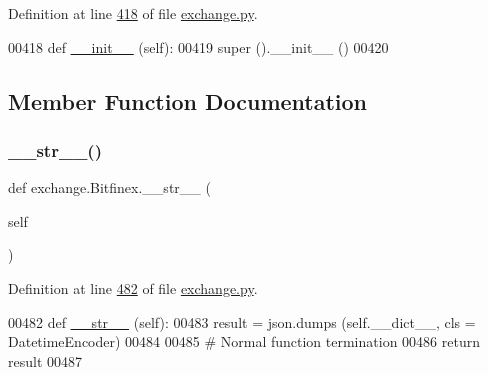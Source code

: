 Definition at line \hyperlink{exchange_8py_source_l00418}{418} of file \hyperlink{exchange_8py_source}{exchange.\+py}.


\begin{DoxyCode}
00418     \textcolor{keyword}{def }\hyperlink{namespacestart__time_a9c9bd378729a13c96a22c8b079ea172c}{\_\_init\_\_} (self):
00419         super ().\_\_init\_\_ ()
00420  
\end{DoxyCode}


\subsection{Member Function Documentation}
\mbox{\label{classexchange_1_1_bitfinex_aef5d2ae00f1574b1258ea73c851a70a8}} 
\subsubsection{\texorpdfstring{\+\_\+\+\_\+str\+\_\+\+\_\+()}{\_\_str\_\_()}}
{\footnotesize\ttfamily def exchange.\+Bitfinex.\+\_\+\+\_\+str\+\_\+\+\_\+ (\begin{DoxyParamCaption}\item[{}]{self }\end{DoxyParamCaption})}



Definition at line \hyperlink{exchange_8py_source_l00482}{482} of file \hyperlink{exchange_8py_source}{exchange.\+py}.


\begin{DoxyCode}
00482     \textcolor{keyword}{def }\hyperlink{namespacerates_a2f1a70c33ee9e255938e4c19fd207264}{\_\_str\_\_} (self):
00483         result = json.dumps (self.\_\_dict\_\_, cls = DatetimeEncoder)
00484         
00485         \textcolor{comment}{# Normal function termination}
00486         \textcolor{keywordflow}{return} result      
00487         
\end{DoxyCode}
\mbox{\label{classexchange_1_1_bitfinex_ae1904e7c72516db02ed1c72cd18f8cdc}} 
